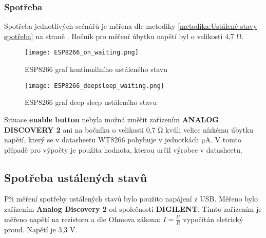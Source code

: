 \documentclass[a4paper, 12pt]{report}
\begin{document}
				\subsubsection{Spotřeba}
					Spotřeba jednotlivých scénářů je měřena dle metodiky \ref{metodika:Ustálené stavy spotřeba} na straně \pageref{metodika:Ustálené stavy spotřeba}. Bočník pro měření úbytku napětí byl o velikosti 4,7 \si{\ohm}. \\

					\begin{figure}[h]
						\centering
						\texttt{[image: ESP8266\_on\_waiting.png]}
						\caption{ESP8266 graf kontinuálního ustáleného stavu }
						\label{ESP8266_on_waiting}
					\end{figure}
					\begin{figure}[h]
						\centering
						\texttt{[image: ESP8266\_deepsleep\_waiting.png]}
						\caption{ESP8266 graf deep sleep ustáleného stavu}
						\label{ESP8266_on_waiting}
					\end{figure}

					Situace {\bf enable button} nebyla možná změřit zařízením {\bf ANALOG DISCOVERY 2} ani na bočníku o velikosti 0,7 \si{\ohm} kvůli velice nízkému úbytku napětí, který se v datasheetu WT8266 pohybuje v jednotkách \si{\micro A}. V tomto případě pro výpočty je použita hodnota, kterou určil výrobce v datasheetu.





			\subsection{Spotřeba ustálených stavů}
				Při měření spotřeby ustálených stavů bylo použito napájení z USB. Měřeno bylo zařízením \textbf{Analog Discovery 2} od společnosti \textbf{DIGILENT}. Tímto zařízením je měřeno napětí na rezistoru a dle Ohmova zákona: $I =\frac{U}{R}$ vypočítán eletrický proud. Napětí je 3,3 V.
\end{document}
